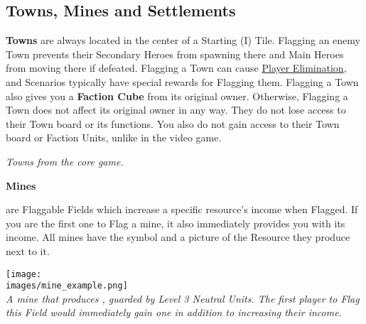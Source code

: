 \begin{multicols*}{2}
\vspace*{\fill}

\pagebreak

\subsection*{Towns, Mines and Settlements}
\textbf{Towns} are always located in the center of a Starting (I) Tile.
Flagging an enemy Town prevents their Secondary Heroes from spawning there and Main Heroes from moving there if defeated.
Flagging a Town can cause \hyperlink{End}{Player Elimination}, and Scenarios typically have special rewards for Flagging them.
Flagging a Town also gives you a \textbf{Faction Cube} from its original owner.
Otherwise, Flagging a Town does not affect its original owner in any way.
They do not lose access to their Town board or its functions.
You also do not gain access to their Town board or Faction Units, unlike in the video game.

\begin{center}
  \textit{Towns from the core game.}
\end{center}

\medskip

\hypertarget{Mines}{\textbf{Mines}} are Flaggable Fields which increase a specific resource's income when Flagged.
If you are the first one to Flag a mine, it also immediately provides you with its income.
All mines have the  symbol and a picture of the Resource they produce next to it.

\begin{center}
  \texttt{[image: \\images/mine\_example.png]}\\
  \textit{A mine that produces , guarded by Level 3 Neutral Units.
    The first player to Flag this Field would immediately gain one  in addition to increasing their  income.
  }
\end{center}
\columnbreak


\end{multicols*}
